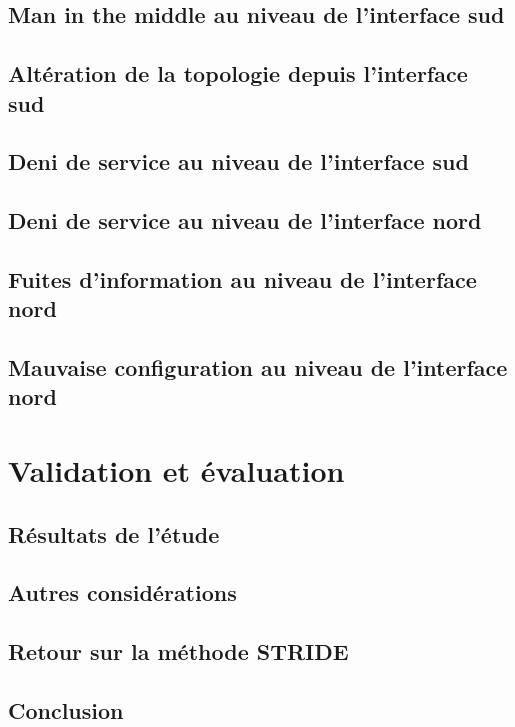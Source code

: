 \documentclass[11pt]{article}
\begin{document}
	\subsection{Man in the middle au niveau de l'interface sud}
		
		\newpage
	\subsection{Altération de la topologie depuis l'interface sud}
		
		\newpage
	\subsection{Deni de service au niveau de l'interface sud}
		
		\newpage
	\subsection{Deni de service au niveau de l'interface nord}
		
		\newpage
	\subsection{Fuites d'information au niveau de l'interface nord}
		
		\newpage
	\subsection{Mauvaise configuration au niveau de l'interface nord}
		
\newpage
{}
\section{Validation et évaluation}
	\subsection{Résultats de l'étude}
		
	\subsection{Autres considérations}
		
	\subsection{Retour sur la méthode STRIDE}
		
	\newpage
	\subsection{Conclusion}
		
\newpage
{}
\end{document}
